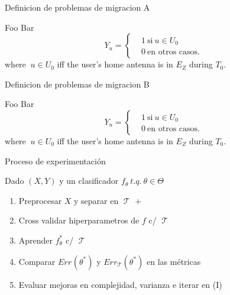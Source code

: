 \documentclass[xcolor=x11names]{beamer}
\DeclareMathOperator{\trainset}{\mathcal{T}}
\DeclareMathOperator{\testset}{\mathcal{T_s}}
\begin{document}


\begin{frame}{Definicion de problemas de migracion A}

			\begin{block}{Foo}
			Bar
			\[
			Y_u =
			\begin{cases}
			&1 \ \mbox{si} \ u \in U_0  \\
			&0 \ \mbox{en otros casos}.
			\end{cases}
			\]
			where $\ u \in U_0$ iff the user's home antenna is in $E_Z$ during $T_0$.
			\end{block}

\end{frame}


\begin{frame}{Definicion de problemas de migracion B}

			\begin{block}{Foo}
			Bar
			\[
			Y_u =
			\begin{cases}
			&1 \ \mbox{si} \ u \in U_0  \\
			&0 \ \mbox{en otros casos}.
			\end{cases}
			\]
			where $\ u \in U_0$ iff the user's home antenna is in $E_Z$ during $T_0$.
			\end{block}

\end{frame}


\begin{frame}{ Proceso de experimentación }

Dado $(X,Y)$ y un clasificador $f_\theta \ t.q. \ \theta \in \Theta$
	\begin{enumerate}[I]
		\item Preprocesar $X$ y separar en $\trainset$ + $\testset$ 
		\item Cross validar hiperparametros de $f$ c/ $\trainset$
		\item Aprender $f_\theta^*$ c/ $\trainset$
		\item Comparar  $Err_{\testset}(\theta^*)$ y  $Err_{\trainset}(\theta^*)$ en las métricas
		\item Evaluar mejoras en complejidad, varianza e iterar en (I)
	\end{enumerate}

\end{frame}
\end{document}
